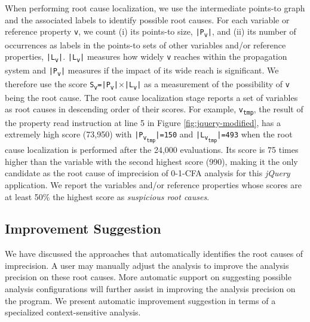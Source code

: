 When performing root cause localization, we use the intermediate points-to graph and the associated labels to identify possible root causes. For each variable or reference property {\tt v}, we count (i) its points-to size, {\tt |P\textsubscript{v}|}, and (ii) its number of occurrences as labels in the points-to sets of other variables and/or reference properties, {\tt |L\textsubscript{v}|}. {\tt |L\textsubscript{v}|} measures how widely {\tt v} reaches within the propagation system and {\tt |P\textsubscript{v}|} measures if the impact of its wide reach is significant. We therefore use the score {\tt S\textsubscript{v}=|P\textsubscript{v}|$\times$|L\textsubscript{v}|} as a measurement of the possibility of {\tt v} being the root cause. The root cause localization stage reports a set of variables as root causes in descending order of their scores. For example, {\tt v\textsubscript{tmp}}, the result of the property read instruction at line 5 in Figure \ref{fig:jquery-modified}, has a extremely high score (73,950) with {\tt |P\textsubscript{v\textsubscript{tmp}}|=150} and {\tt |L\textsubscript{v\textsubscript{tmp}}|=493} when the root cause localization is performed after the 24,000 evaluations. Its score is 75 times higher than the variable with the second highest score (990), making it the only candidate as the root cause of imprecision of 0-1-CFA analysis for this {\it jQuery} application. We report the variables and/or reference properties whose scores are at least 50\% the highest score as {\it suspicious root causes}.


\subsection{Improvement Suggestion}

We have discussed the approaches that automatically identifies the root causes of imprecision. A user may manually adjust the analysis to improve the analysis precision on these root causes. More automatic support on suggesting possible analysis configurations will further assist in improving the analysis precision on the program. We present automatic improvement suggestion in terms of a specialized context-sensitive analysis.

